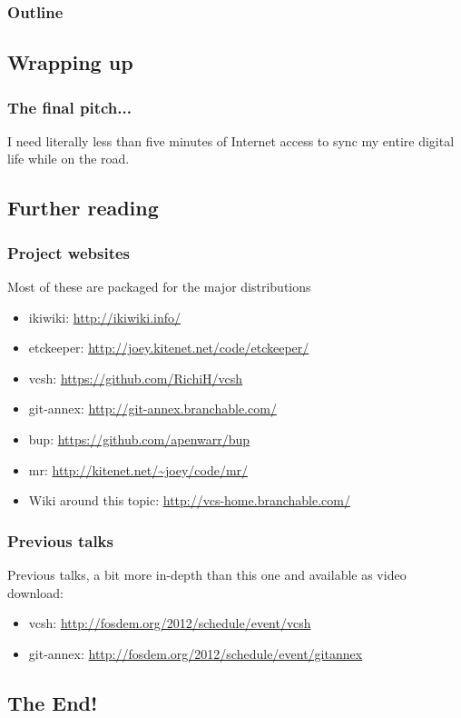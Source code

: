 \documentclass[t]{beamer}
\begin{document}
\begin{frame}
	\frametitle{Outline}
	\tableofcontents[currentsection]
\end{frame}

\subsection{Wrapping up}

\begin{frame}
	\frametitle{The final pitch...}
	\vfill
	I need literally less than five minutes of Internet access to sync my entire digital life while on the road.
	\vfill
\end{frame}

\subsection{Further reading}

\begin{frame}
	\frametitle{Project websites}
	Most of these are packaged for the major distributions
	\begin{itemize}
		\item ikiwiki: \url{http://ikiwiki.info/}
		\item etckeeper: \url{http://joey.kitenet.net/code/etckeeper/}
		\item vcsh: \url{https://github.com/RichiH/vcsh}
		\item git-annex: \url{http://git-annex.branchable.com/}
		\item bup: \url{https://github.com/apenwarr/bup}
		\item mr: \url{http://kitenet.net/~joey/code/mr/}
		\item Wiki around this topic: \url{http://vcs-home.branchable.com/}
	\end{itemize}
\end{frame}

\begin{frame}
	\frametitle{Previous talks}
	Previous talks, a bit more in-depth than this one and available as video download:
	\begin{itemize}
		\item vcsh: \url{http://fosdem.org/2012/schedule/event/vcsh}
		\item git-annex: \url{http://fosdem.org/2012/schedule/event/gitannex}
	\end{itemize}
\end{frame}

\subsection{The End!}
\end{document}
